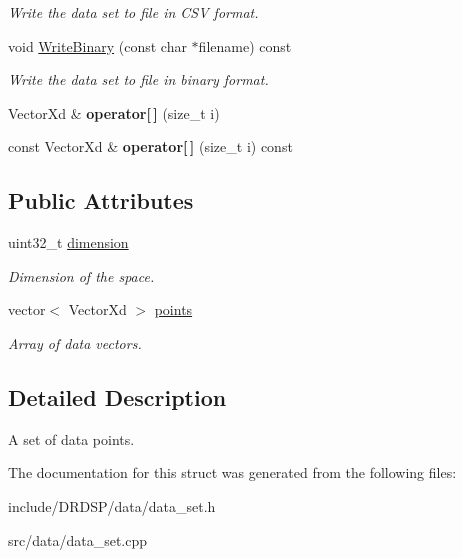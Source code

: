 \begin{DoxyCompactItemize}
\begin{DoxyCompactList}\small\item\em Write the data set to file in C\-S\-V format. \end{DoxyCompactList}\item 
\hypertarget{struct_d_r_d_s_p_1_1_data_set_a3003901476d4b92d122a64d78d67e212}{void \hyperlink{struct_d_r_d_s_p_1_1_data_set_a3003901476d4b92d122a64d78d67e212}{Write\-Binary} (const char $\ast$filename) const }\label{struct_d_r_d_s_p_1_1_data_set_a3003901476d4b92d122a64d78d67e212}

\begin{DoxyCompactList}\small\item\em Write the data set to file in binary format. \end{DoxyCompactList}\item 
\hypertarget{struct_d_r_d_s_p_1_1_data_set_a6124959ad62a522b65cf6ad715166354}{Vector\-Xd \& {\bfseries operator\mbox{[}$\,$\mbox{]}} (size\-\_\-t i)}\label{struct_d_r_d_s_p_1_1_data_set_a6124959ad62a522b65cf6ad715166354}

\item 
\hypertarget{struct_d_r_d_s_p_1_1_data_set_aea3071fb03508e07e4d39056247eaaf9}{const Vector\-Xd \& {\bfseries operator\mbox{[}$\,$\mbox{]}} (size\-\_\-t i) const }\label{struct_d_r_d_s_p_1_1_data_set_aea3071fb03508e07e4d39056247eaaf9}

\end{DoxyCompactItemize}
\subsection*{Public Attributes}
\begin{DoxyCompactItemize}
\item 
\hypertarget{struct_d_r_d_s_p_1_1_data_set_aa2598262725329c137e03b8947638780}{uint32\-\_\-t \hyperlink{struct_d_r_d_s_p_1_1_data_set_aa2598262725329c137e03b8947638780}{dimension}}\label{struct_d_r_d_s_p_1_1_data_set_aa2598262725329c137e03b8947638780}

\begin{DoxyCompactList}\small\item\em Dimension of the space. \end{DoxyCompactList}\item 
\hypertarget{struct_d_r_d_s_p_1_1_data_set_ac486c907dea215957d503dc4dc9d76e3}{vector$<$ Vector\-Xd $>$ \hyperlink{struct_d_r_d_s_p_1_1_data_set_ac486c907dea215957d503dc4dc9d76e3}{points}}\label{struct_d_r_d_s_p_1_1_data_set_ac486c907dea215957d503dc4dc9d76e3}

\begin{DoxyCompactList}\small\item\em Array of data vectors. \end{DoxyCompactList}\end{DoxyCompactItemize}


\subsection{Detailed Description}
A set of data points. 

The documentation for this struct was generated from the following files\-:\begin{DoxyCompactItemize}
\item 
include/\-D\-R\-D\-S\-P/data/data\-\_\-set.\-h\item 
src/data/data\-\_\-set.\-cpp\end{DoxyCompactItemize}
